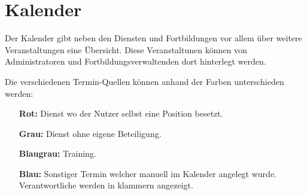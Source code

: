 \chapter{Kalender}
\label{cha:calendar}

Der Kalender gibt neben den Diensten und Fortbildungen vor allem über weitere Veranstaltungen eine Übersicht. Diese Veranstaltunen können von Administratoren und Fortbildungsverwaltenden dort hinterlegt werden.

Die verschiedenen Termin-Quellen können anhand der Farben unterschieden werden:
\begin{itemize}
    \item[\textbf{Rot:}] Dienst wo der Nutzer selbst eine Position besetzt.
	\item[\textbf{Grau:}] Dienst ohne eigene Beteiligung.
	\item[\textbf{Blaugrau:}] Training.
	\item[\textbf{Blau:}] Sonstiger Termin welcher manuell im Kalender angelegt wurde. Verantwortliche werden in klammern angezeigt.
\end{itemize}